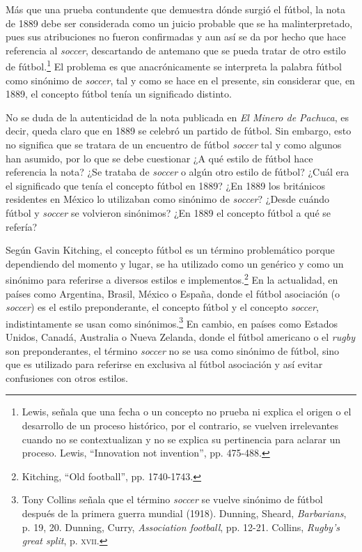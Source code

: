 \documentclass[11pt,a5paper,twoside]{book} %
\begin{document}
Más que una prueba contundente que demuestra dónde surgió el fútbol, la nota de 1889 debe ser considerada como un juicio probable que se ha malinterpretado, pues sus atribuciones no fueron confirmadas y aun así se da por hecho que hace referencia al \emph{soccer}, descartando de antemano que se pueda tratar de otro estilo de fútbol.\footnote{Lewis, señala que una fecha o un concepto no prueba ni explica el origen o el desarrollo de un proceso histórico, por el contrario, se vuelven irrelevantes cuando no se contextualizan y no se explica su pertinencia para aclarar un proceso. Lewis, ``Innovation not invention'', pp. 475-488.} El problema es que anacrónicamente se interpreta la palabra fútbol como sinónimo de \emph{soccer}, tal y como se hace en el presente, sin considerar que, en 1889, el concepto fútbol tenía un significado distinto.

No se duda de la autenticidad de la nota publicada en \emph{El Minero de Pachuca}, es decir, queda claro que en 1889 se celebró un partido de fútbol. Sin embargo, esto no significa que se tratara de un encuentro de fútbol \emph{soccer} tal y como algunos han asumido, por lo que se debe cuestionar ¿A qué estilo de fútbol hace referencia la nota? ¿Se trataba de \emph{soccer} o algún otro estilo de fútbol? ¿Cuál era el significado que tenía el concepto fútbol en 1889? ¿En 1889 los británicos residentes en México lo utilizaban como sinónimo de \emph{soccer}? ¿Desde cuándo fútbol y \emph{soccer} se volvieron sinónimos? ¿En 1889 el concepto fútbol a qué se refería?

Según Gavin Kitching, el concepto fútbol es un término problemático porque dependiendo del momento y lugar, se ha utilizado como un genérico y como un sinónimo para referirse a diversos estilos e implementos.\footnote{Kitching, ``Old football'', pp. 1740-1743.} En la actualidad, en países como Argentina, Brasil, México o España, donde el fútbol asociación (o \emph{soccer}) es el estilo preponderante, el concepto fútbol y el concepto \emph{soccer}, indistintamente se usan como sinónimos.\footnote{Tony Collins señala que el término \emph{soccer} se vuelve sinónimo de fútbol después de la primera guerra mundial (1918). Dunning, Sheard, \emph{Barbarians}, p. 19, 20. Dunning, Curry, \emph{Association football}, pp. 12-21. Collins, \emph{Rugby's great split}, p. \textsc{xvii}.} En cambio, en países como Estados Unidos, Canadá, Australia o Nueva Zelanda, donde el fútbol americano o el \emph{rugby} son preponderantes, el término \emph{soccer} no se usa como sinónimo de fútbol, sino que es utilizado para referirse en exclusiva al fútbol asociación y así evitar confusiones con otros estilos.
\end{document}
